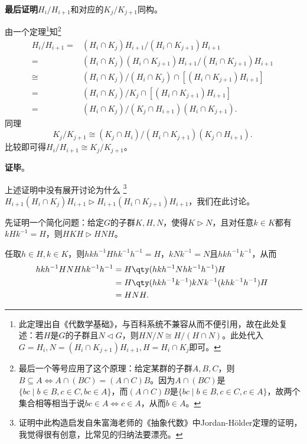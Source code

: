 \textbf{最后证明}$H_i/H_{i+1}$和对应的$K_j/K_{j+1}$同构。

由一个定理\footnote{此定理出自《代数学基础》，与百科系统不兼容从而不便引用，故在此处复述：若$H$是$G$的子群且$N\lhd G$，则$HN/N\cong H/(H\cap N)$。此处代入$G=H_i, N=(H_i\cap K_{j+1})H_{i+1}, H=H_i\cap K_j$即可。}知\footnote{最后一个等号应用了这个原理：给定某群的子群$A, B, C$，则$B\subseteq A \iff A\cap(BC)=(A\cap C)B$。因为$A\cap (BC)$是$\{bc\mid b\in B, c\in C, bc\in A\}$，而$(A\cap C)B$是$\{bc\mid b\in B, c\in C, c\in A\}$，故两个集合相等相当于说$bc\in A\iff c\in A$，从而$b\in A$。}
\begin{equation}
    \begin{aligned}
    H_i/H_{i+1} ={}& (H_i\cap K_j)H_{i+1} / (H_i\cap K_{j+1})H_{i+1}\\
    ={}& (H_i\cap K_j)(H_i\cap K_{j+1})H_{i+1} / (H_i\cap K_{j+1})H_{i+1}\\
    \cong{}& (H_i\cap K_j) / (H_i\cap K_j)\cap[(H_i\cap K_{j+1})H_{i+1}]\\
    ={}& (H_i\cap K_j) / K_j\cap[(H_i\cap K_{j+1})H_{i+1}]\\
    ={}& (H_i\cap K_j) / (K_j\cap H_{i+1})(H_i\cap K_{j+1}). 
    \end{aligned}
~\end{equation}
同理
\begin{equation}
    K_j/K_{j+1} \cong (K_j\cap H_i)/(H_i\cap K_{j+1})(K_j\cap H_{i+1}). 
~\end{equation}
比较即可得$H_i/H_{i+1} \cong K_j/K_{j+1}$。



\textbf{证毕}。



上述证明中没有展开讨论为什么
\footnote{证明中此构造启发自朱富海老师的《抽象代数》中Jordan-Hölder定理的证明，我觉得很有创意，比常见的归纳法要漂亮。}
$H_{i+1}(H_i\cap K_j)H_{i+1}\rhd H_{i+1}(H_i\cap K_{j+1})H_{i+1}$，我们在此讨论。

先证明一个简化问题：给定$G$的子群$K, H, N$，使得$K\rhd N$，且对任意$k\in K$都有$kHk^{-1}=H$，则$HKH\rhd HNH$。

任取$h\in H, k\in K$，则$hkh^{-1} H hk^{-1}h^{-1}=H$，$kNk^{-1}=N$且$hkh^{-1}k^{-1}$，从而
\begin{equation}
    \begin{aligned}
    hkh^{-1} HNH hk^{-1}h^{-1} ={}&  H\qty(hkh^{-1} N hk^{-1}h^{-1})H\\
    ={}& H\qty(hkh^{-1} k^{-1} )k N k^{-1} (k hk^{-1}h^{-1})H\\
    ={}& HNH. 
    \end{aligned}~
\end{equation}

